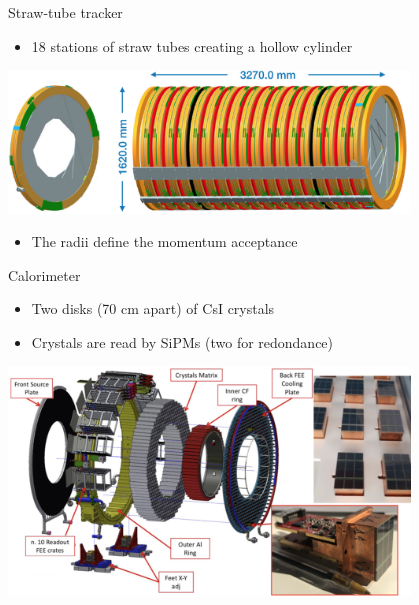 \documentclass[10pt]{beamer}
\begin{document}
%
\begin{frame}{Straw-tube tracker}
\centering
\begin{itemize}
\item 18 stations of straw tubes creating a hollow cylinder
\end{itemize}
\includegraphics[width=0.8\textwidth]{Tracker_2}
\begin{itemize}
\item The radii define the momentum acceptance
\end{itemize}
\vspace{0.2cm}
\end{frame}

%
\begin{frame}{Calorimeter}
\begin{itemize}
\item Two disks (70 cm apart) of CsI crystals
\item Crystals are read by SiPMs (two for redondance)
\end{itemize}
\centering
\includegraphics[width=0.8\textwidth]{mu2e_calorimeter_disk_2}
\end{frame}
\end{document}
